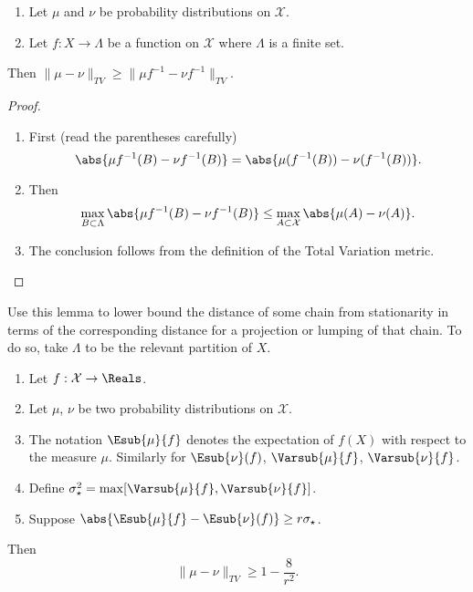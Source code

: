 \documentclass[12pt]{article}
\begin{document}
\begin{lemma}
    \label{thm:convergencestationary:lem710}
    \begin{enumerate}
        \item
            Let \( \mu \) and \( \nu \) be probability distributions on \(
            \mathcal{X} \).
        \item
            Let \( f:X \to \Lambda \) be a function on \( \mathcal{X} \)
            where \( \Lambda \) is a finite set.
    \end{enumerate}
    Then \( \| \mu - \nu \|_{TV} \ge \| \mu f^{-1} - \nu f^{-1} \|_{TV} \).
\end{lemma}

\begin{proof}
    \begin{enumerate}
        \item
            First (read the parentheses carefully)
            \[
                \abs{\mu f^{-1}(B) - \nu f^{-1}(B)} = \abs{\mu (f^{-1}(B))
                - \nu (f^{-1}(B))}.
            \]
        \item
            Then
            \[
                \max_{B \subset \Lambda}\abs{\mu f^{-1}(B) - \nu f^{-1}(B)}
                \le \max_{A \subset \mathcal{X}}\abs{\mu (A) - \nu (A)}.
            \]
        \item
            The conclusion follows from the definition of the Total
            Variation metric.
    \end{enumerate}
\end{proof}

\begin{remark}
    Use this lemma to lower bound the distance of some chain from
    stationarity in terms of the corresponding distance for a projection
    or lumping of that chain.  To do so, take \( \Lambda \) to be the
    relevant partition of \( X \).
\end{remark}

\begin{proposition}
    \label{thm:convergencestationary:prop79}
    \begin{enumerate}
        \item
            Let \( f:\mathcal{X} \to \Reals \).
        \item
            Let \( \mu \), \( \nu \) be two probability distributions on
            \( \mathcal{X} \).
        \item
            The notation \( \Esub{\mu}{f} \) denotes the expectation of \(
            f(X) \) with respect to the measure \( \mu \).  Similarly
            for \( \Esub{\nu}(f) \), \( \Varsub{\mu}{f} \), \( \Varsub{\nu}
            {f} \).
        \item
            Define \( \sigma_{\star}^2 = \max[ \Varsub{\mu}{f}, \Varsub{\nu}
            {f} ] \).
        \item
            Suppose \( \abs{ \Esub{\mu}{f} - \Esub{\nu}(f)} \ge r \sigma_
            {\star} \).
    \end{enumerate}
    Then
    \[
        \| \mu - \nu \|_{TV} \ge 1 - \frac{8}{r^2}.
    \]
\end{proposition}
\end{document}
